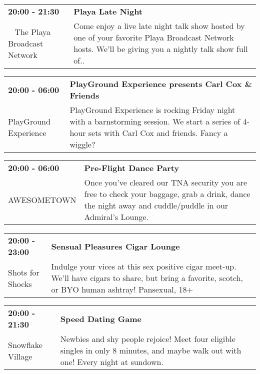 \begin{tabular}{ p{1in} p{2.2in} }
    \textbf{20:00 - 21:30} & \textbf{Playa Late Night} \\
    ~ \newline The Playa Broadcast Network & Come enjoy a live late night talk show hosted by one of your favorite Playa Broadcast Network hosts. We'll be giving you a nightly talk show full of.. \\
    \hline 
\end{tabular}
    
\begin{tabular}{ p{1in} p{2.2in} }
    \textbf{20:00 - 06:00} & \textbf{PlayGround Experience presents Carl Cox \& Friends} \\
    PlayGround Experience \newline  & PlayGround Experience is rocking Friday night with a barnstorming session. We start a series of 4-hour sets with Carl Cox and friends. Fancy a wiggle? \\
    \hline 
\end{tabular}
    
\begin{tabular}{ p{1in} p{2.2in} }
    \textbf{20:00 - 06:00} & \textbf{Pre-Flight Dance Party} \\
    AWESOMETOWN \newline  & Once you've cleared our TNA security you are free to check your baggage, grab a drink, dance the night away and cuddle/puddle in our Admiral's Lounge. \\
    \hline 
\end{tabular}
    
\begin{tabular}{ p{1in} p{2.2in} }
    \textbf{20:00 - 23:00} & \textbf{Sensual Pleasures Cigar Lounge} \\
    Shots for Shocks \newline  & Indulge your vices at this sex positive cigar meet-up. We'll have cigars to share, but bring a favorite, scotch, or BYO human ashtray! Pansexual, 18+ \\
    \hline 
\end{tabular}
    
\begin{tabular}{ p{1in} p{2.2in} }
    \textbf{20:00 - 21:30} & \textbf{Speed Dating Game} \\
    Snowflake Village \newline  & Newbies and shy people rejoice! Meet four eligible singles in only 8 minutes, and maybe walk out with one! Every night at sundown. \\
    \hline 
\end{tabular}
    

